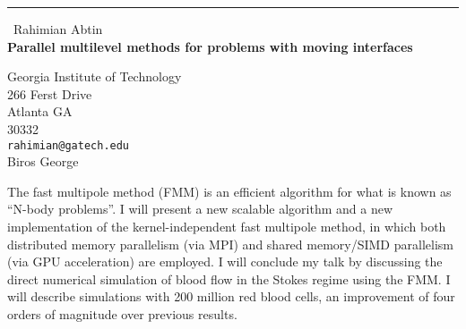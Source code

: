 \documentclass{report}
\begin{document}
\begin{center}
\rule{6in}{1pt} \
{\large Rahimian Abtin \\
{\bf Parallel multilevel methods for problems with moving interfaces}}

Georgia Institute of Technology \\ 266 Ferst Drive \\ Atlanta GA \\ 30332
\\
{\tt rahimian@gatech.edu}\\
Biros George\end{center}

The fast multipole method (FMM) is an efficient algorithm for what is
known as ``N-body problems''. I will present a new scalable algorithm
and a new implementation of the kernel-independent fast multipole
method, in which both distributed memory parallelism (via MPI) and
shared memory/SIMD parallelism (via GPU acceleration) are employed. I
will conclude my talk by discussing the direct numerical simulation of
blood flow in the Stokes regime using the FMM. I will describe
simulations with 200 million red blood cells, an improvement of four
orders of magnitude over previous results.
\end{document}
